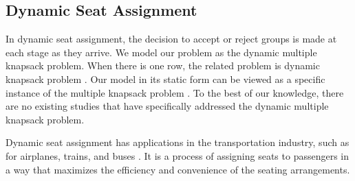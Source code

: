 





\subsection{Dynamic Seat Assignment}
In dynamic seat assignment, the decision to accept or reject groups is made at each stage as they arrive. We model our problem as the dynamic multiple knapsack problem. When there is one row, the related problem is dynamic knapsack problem \cite{kleywegt1998dynamic}. Our model in its static form can be viewed as a specific instance of the multiple knapsack problem \cite{pisinger1999exact}. To the best of our knowledge, there are no existing studies that have specifically addressed the dynamic multiple knapsack problem.

Dynamic seat assignment has applications in the transportation industry, such as for airplanes, trains, and buses \cite{hamdouch2011schedule, berge1993demand, zhu2023assign}. It is a process of assigning seats to passengers in a way that maximizes the efficiency and convenience of the seating arrangements.


